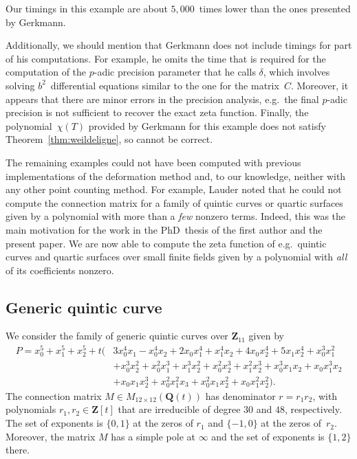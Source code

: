 \documentclass[a4paper,11pt]{article}
\numberwithin{equation}{section}
\newcommand{\ZZ}{\mathbf{Z}} %
\newcommand{\QQ}{\mathbf{Q}} %
\theoremstyle{definition}
\begin{document}
Our timings in this example are about $5,000$~times lower than the ones 
presented by Gerkmann. 

Additionally, we should mention that Gerkmann does not include timings for part 
of his computations.  For example, he omits the time that is required for the 
computation of the $p$-adic precision parameter that he calls $\delta$, which 
involves solving $b^2$~differential equations similar to the one for the matrix~$C$. 
Moreover, it appears that there are minor errors in the precision analysis, e.g.\ 
the final $p$-adic precision is not sufficient to recover the exact zeta function. 
Finally, the polynomial~$\chi(T)$ provided by Gerkmann for this example does 
not satisfy Theorem~\ref{thm:weildeligne}, so cannot be correct.

The remaining examples could not have been computed with previous implementations 
of the deformation method and, to our knowledge, neither with any other point counting 
method.  For example, Lauder noted that he could not compute the connection matrix 
for a family of quintic curves or quartic surfaces given by a polynomial with more 
than a \emph{few} nonzero terms.  Indeed, this was the main motivation for the work 
in the PhD~thesis of the first author and the present paper.  We are now able to 
compute the zeta function of e.g.\ quintic curves and quartic surfaces over small 
finite fields given by a polynomial with \emph{all} of its coefficients nonzero.

\subsection{Generic quintic curve}

We consider the family of generic quintic curves over $\ZZ_{11}$ given by 
\begin{equation*}
\begin{split}
P = x_0^5 + x_1^5 + x_2^5 
+ t \bigl( & 3x_0^4 x_1-x_0^4 x_2+2 x_0 x_1^4+x_1^4 x_2+4 x_0 x_2^4+5 x_1 x_2^4 + x_0^3 x_1^2 \\
           & + x_0^3 x_2^2 + x_0^2 x_1^3+ x_1^3 x_2^2+x_0^2 x_2^3+x_1^2 x_2^3 + x_0^3 x_1 x_2 + x_0 x_1^3 x_2 \\
           & + x_0 x_1 x_2^3 + x_0^2 x_1^2 x_3 + x_0^2 x_1 x_2^2 + x_0 x_1^2 x_2^2 \bigr).
\end{split}
\end{equation*}
The connection matrix $M \in M_{12 \times 12}(\QQ(t))$ has denominator 
$r = r_1 r_2$, with polynomials $r_1,r_2 \in \ZZ[t]$ that are irreducible 
of degree $30$ and $48$, respectively. The set of exponents is $\{ 0,1 \}$ 
at the zeros of $r_1$ and $\{ -1,0 \}$ at the zeros of~$r_2$. Moreover, 
the matrix $M$ has a simple pole at $\infty$ and the set of exponents 
is $\{1,2\}$ there.
\end{document}
